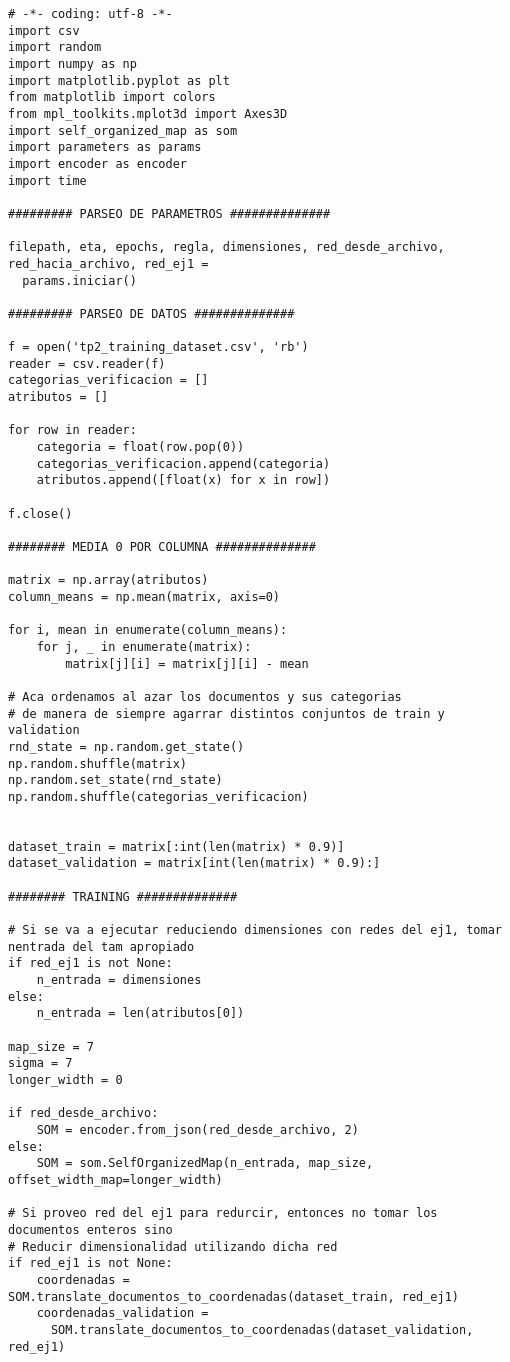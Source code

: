 \begin{changemargin}{-2.0cm}{-1.5cm} 
\begin{verbatim}
# -*- coding: utf-8 -*-
import csv
import random
import numpy as np
import matplotlib.pyplot as plt
from matplotlib import colors
from mpl_toolkits.mplot3d import Axes3D
import self_organized_map as som
import parameters as params
import encoder as encoder
import time

######### PARSEO DE PARAMETROS ##############

filepath, eta, epochs, regla, dimensiones, red_desde_archivo, red_hacia_archivo, red_ej1 = 
  params.iniciar()

######### PARSEO DE DATOS ##############

f = open('tp2_training_dataset.csv', 'rb')
reader = csv.reader(f)
categorias_verificacion = []
atributos = []

for row in reader:
    categoria = float(row.pop(0))
    categorias_verificacion.append(categoria)
    atributos.append([float(x) for x in row])

f.close()

######## MEDIA 0 POR COLUMNA ##############

matrix = np.array(atributos)
column_means = np.mean(matrix, axis=0)

for i, mean in enumerate(column_means):
    for j, _ in enumerate(matrix):
        matrix[j][i] = matrix[j][i] - mean

# Aca ordenamos al azar los documentos y sus categorias
# de manera de siempre agarrar distintos conjuntos de train y validation
rnd_state = np.random.get_state()
np.random.shuffle(matrix)
np.random.set_state(rnd_state)
np.random.shuffle(categorias_verificacion)


dataset_train = matrix[:int(len(matrix) * 0.9)]
dataset_validation = matrix[int(len(matrix) * 0.9):]

######## TRAINING ##############

# Si se va a ejecutar reduciendo dimensiones con redes del ej1, tomar nentrada del tam apropiado
if red_ej1 is not None:
    n_entrada = dimensiones
else:
    n_entrada = len(atributos[0])

map_size = 7
sigma = 7
longer_width = 0

if red_desde_archivo:
    SOM = encoder.from_json(red_desde_archivo, 2)
else:
    SOM = som.SelfOrganizedMap(n_entrada, map_size, offset_width_map=longer_width)

# Si proveo red del ej1 para redurcir, entonces no tomar los documentos enteros sino
# Reducir dimensionalidad utilizando dicha red
if red_ej1 is not None:
    coordenadas = SOM.translate_documentos_to_coordenadas(dataset_train, red_ej1)
    coordenadas_validation = 
      SOM.translate_documentos_to_coordenadas(dataset_validation, red_ej1)


\end{verbatim}
\end{changemargin}
